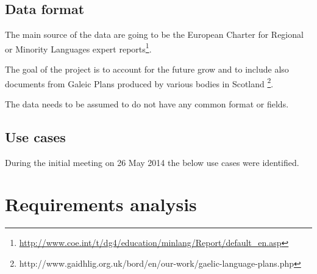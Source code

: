 \documentclass[11pt, a4paper]{report}
\begin{document}
\section{Data format}
The main source of the data are going to be the European Charter for Regional or Minority Languages expert reports\footnote{\url{http://www.coe.int/t/dg4/education/minlang/Report/default_en.asp}}.

The goal of the project is to account for the future grow and to include also documents from Galeic Plans produced by various bodies in Scotland \footnote{http://www.gaidhlig.org.uk/bord/en/our-work/gaelic-language-plans.php}.

The data needs to be assumed to do not have any common format or fields.

\section{Use cases}
During the initial meeting on 26 May 2014 the below use cases were identified.










\chapter{Requirements analysis}
\end{document}
